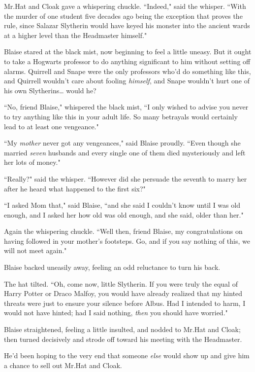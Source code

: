 Mr.\?Hat and Cloak gave a whispering chuckle. ``Indeed," said the whisper. ``With the murder of one student five decades ago being the exception that proves the rule, since Salazar Slytherin would have keyed his monster into the ancient wards at a higher level than the Headmaster himself."

Blaise stared at the black mist, now beginning to feel a little uneasy. But it ought to take a Hogwarts professor to do anything significant to him without setting off alarms. Quirrell and Snape were the only professors who'd do something like this, and Quirrell wouldn't care about fooling \emph{himself}, and Snape wouldn't hurt one of his own Slytherins{\ldots} would he?

``No, friend Blaise," whispered the black mist, ``I only wished to advise you never to try anything like this in your adult life. So many betrayals would certainly lead to at least one vengeance."

``My \emph{mother} never got any vengeances," said Blaise proudly. ``Even though she married \emph{seven} husbands and every single one of them died mysteriously and left her lots of money."

``Really?" said the whisper. ``However did she persuade the seventh to marry her after he heard what happened to the first six?"

``I asked Mom that," said Blaise, ``and she said I couldn't know until I was old enough, and I asked her how old was old enough, and she said, older than her."

Again the whispering chuckle. ``Well then, friend Blaise, my congratulations on having followed in your mother's footsteps. Go, and if you say nothing of this, we will not meet again."

Blaise backed uneasily away, feeling an odd reluctance to turn his back.

The hat tilted. ``Oh, come now, little Slytherin. If you were truly the equal of Harry Potter or Draco Malfoy, you would have already realized that my hinted threats were just to ensure your silence before Albus. Had I intended to harm, I would not have hinted; had I said nothing, \emph{then} you should have worried."

Blaise straightened, feeling a little insulted, and nodded to Mr.\?Hat and Cloak; then turned decisively and strode off toward his meeting with the Headmaster.

He'd been hoping to the very end that someone \emph{else} would show up and give him a chance to sell out Mr.\?Hat and Cloak.

